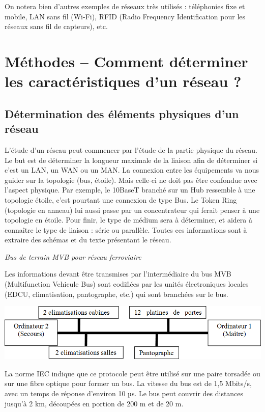 \documentclass[10pt]{article}
\begin{document}
On notera bien d’autres exemples de réseaux très utilisés : téléphonies fixe et mobile, LAN sans fil (Wi-Fi), RFID (Radio Frequency Identification pour les réseaux sans fil de capteurs), etc.
 

\section{Méthodes -- Comment déterminer les caractéristiques d’un réseau ?}
\subsection{Détermination des éléments physiques d’un réseau}

L’étude d’un réseau peut commencer par l’étude de la partie physique du réseau. Le but est de déterminer la longueur maximale de la liaison afin de déterminer si c’est un LAN, un WAN ou un MAN. La connexion entre les équipements va nous guider sur la topologie (bus, étoile). Mais celle-ci ne doit pas être confondue avec l’aspect physique. Par exemple, le 10BaseT branché sur un Hub ressemble à une topologie étoile, c’est pourtant une connexion de type Bus. Le Token Ring (topologie en anneau) lui aussi passe par un concentrateur qui ferait penser à une topologie en étoile. Pour finir, le type de médium sera à déterminer, et aidera à connaître le type de liaison : série ou parallèle. Toutes ces informations sont à extraire des schémas et du texte présentant le réseau.

\begin{exemple}
\textit{Bus de terrain MVB pour réseau ferroviaire}
\end{exemple}

Les informations devant être transmises par l’intermédiaire du bus MVB (Multifunction Vehicule Bus) sont codifiées par les unités électroniques locales (EDCU, climatisation, pantographe, etc.) qui sont branchées sur le bus.

\begin{center}
\includegraphics[width=.8\textwidth]{images/fig_23}
\end{center}

La norme IEC indique que ce protocole peut être utilisé sur une paire torsadée ou sur une fibre optique pour former un bus.
La vitesse du bus est de 1,5 Mbits/s, avec un temps de réponse d’environ 10 µs. 
Le bus peut couvrir des distances jusqu’à 2 km, découpées en portion de 200 m et de 20 m.
\end{document}
